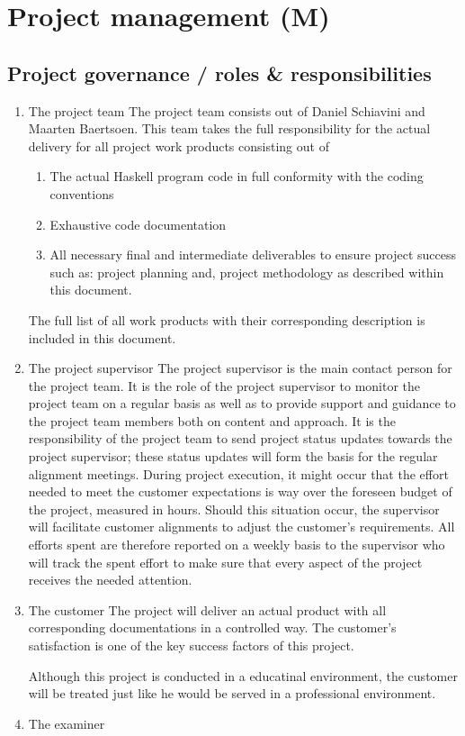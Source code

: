 \section{Project management (M)}
\label{sec:project-management}
\subsection{Project governance / roles \& responsibilities}
\begin{enumerate}
\item The project team
The project team consists out of Daniel Schiavini and Maarten Baertsoen.
This team takes the full responsibility for the actual delivery for all project work products consisting out of
\begin{enumerate}
\item The actual Haskell program code in full conformity with the coding conventions
\item Exhaustive code documentation
\item All necessary final and intermediate deliverables to ensure project success such as: project planning and, project methodology as described within this document. 
\end {enumerate}
The full list of all work products with their corresponding description is included in this document.
\item The project supervisor
The project supervisor is the main contact person for the project team. It is the role of the project supervisor to monitor the project team on a regular basis as well as to provide support and guidance to the project team members both on content and approach.
It is the responsibility of the project team to send project status updates towards the project supervisor; these status updates will form the basis for the regular alignment meetings. 
During project execution, it might occur that the effort needed to meet the customer expectations is way over the foreseen budget of the project, measured in hours. 
Should this situation occur, the supervisor will facilitate customer alignments to adjust the customer’s requirements.
All efforts spent are therefore reported on a weekly basis to the supervisor who will track the spent effort to make sure that every aspect of the project receives the needed attention.

\item The customer
The project will deliver an actual product with all corresponding documentations in a controlled way. 
The customer's satisfaction is one of the key success factors of this project.

Although this project is conducted in a educatinal environment, the customer will be treated just like he would be served in a professional environment. 

\item The examiner
\end {enumerate}


